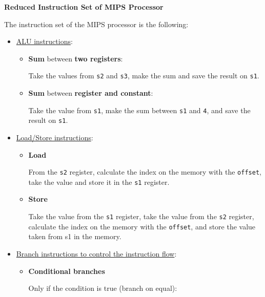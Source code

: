 \documentclass[a4paper]{article}
\begin{document}
    \begin{center}
        \large
        \textcolor{Red3}{\textbf{Reduced Instruction Set of MIPS Processor}}
    \end{center}
    The instruction set of the MIPS processor is the following:
    \begin{itemize}
        \item \underline{ALU instructions}:
        \begin{itemize}
            \item \textbf{Sum} between \textbf{two registers}:
            
            Take the values from \texttt{s2} and \texttt{s3}, make the sum and save the result on \texttt{s1}.

            \item \textbf{Sum} between \textbf{register and constant}:
            
            Take the value from \texttt{s1}, make the sum between \texttt{s1} and \texttt{4}, and save the result on \texttt{s1}.
        \end{itemize}

        \item \underline{Load/Store instructions}:
        \begin{itemize}
            \item \textbf{Load}
            
            From the \texttt{s2} register, calculate the index on the memory with the \texttt{offset}, take the value and store it in the \texttt{s1} register.

            \item \textbf{Store}
            
            Take the value from the \texttt{s1} register, take the value from the \texttt{s2} register, calculate the index on the memory with the \texttt{offset}, and store the value taken from s1 in the memory.
        \end{itemize}

        \item \underline{Branch instructions to control the instruction flow}:
        \begin{itemize}
            \item \textbf{Conditional branches}
            
            Only if the condition is true (branch on equal):
            
            

\end{itemize}
\end{itemize}
\end{document}

